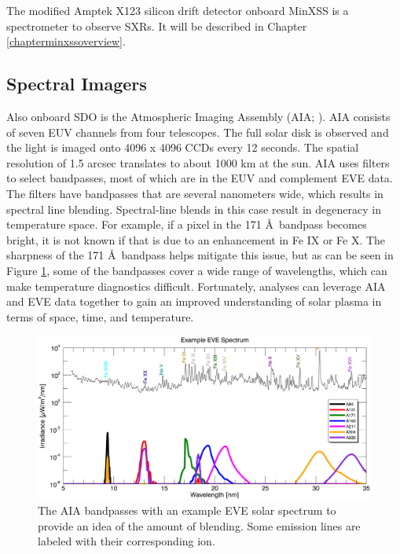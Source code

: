 The modified Amptek X123 silicon drift detector onboard MinXSS is a spectrometer to observe SXRs. It will be described in Chapter \ref{chapterminxssoverview}. 

\subsection{Spectral Imagers}
Also onboard SDO is the Atmospheric Imaging Assembly (AIA; \citealt{Lemen2012}). AIA consists of seven EUV channels from four telescopes. The full solar disk is observed and the light is imaged onto 4096 x 4096 CCDs every 12 seconds. The spatial resolution of 1.5 arcsec translates to about 1000 km at the sun. AIA uses filters to select bandpasses, most of which are in the EUV and complement EVE data. The filters have bandpasses that are several nanometers wide, which results in spectral line blending. Spectral-line blends in this case result in degeneracy in temperature space. For example, if a pixel in the 171 \AA\ bandpass becomes bright, it is not known if that is due to an enhancement in Fe IX or Fe X. The sharpness of the 171 \AA\ bandpass helps mitigate this issue, but as can be seen in Figure \ref{fig:aiabandpasses}, some of the bandpasses cover a wide range of wavelengths, which can make temperature diagnostics difficult. Fortunately, analyses can leverage AIA and EVE data together to gain an improved understanding of solar plasma in terms of space, time, and temperature. 

\begin{figure}[!h]
    \begin{center}
	    \includegraphics[width=\textwidth]{Images/AiaBandpasses.png}
    \end{center}
    \caption[AIA bandpasses]{
	    The AIA bandpasses with an example EVE solar spectrum to provide an idea of the amount of blending. 
	    Some emission lines are labeled with their corresponding ion. 
	}
    \label{fig:aiabandpasses}
\end{figure}

